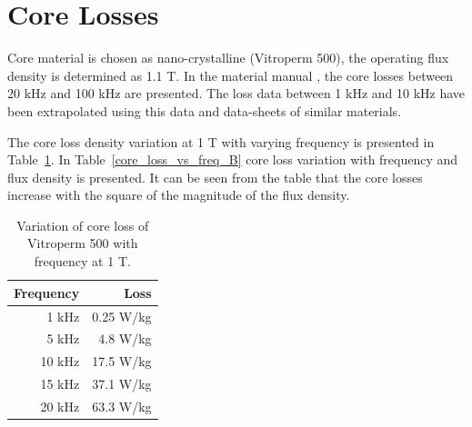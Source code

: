 \documentclass[a4paper, 11pt]{article} %
\begin{document}
\section{Core Losses}
Core material is chosen as nano-crystalline (Vitroperm 500), the operating flux density is determined as 1.1 T.  In the material manual \cite{Vacuumschmelze2003}, the core losses between 20 kHz and 100 kHz are presented. The loss data between 1 kHz  and 10 kHz have been extrapolated using this data and data-sheets of similar materials.  

The core loss density variation at 1 T with varying frequency is presented in Table~\ref{core_loss_vs_freq}. In Table~\ref{core_loss_vs_freq_B} core loss variation with frequency and flux density is presented. It can be seen from the table that the core losses increase with the square of the magnitude of the flux density. 
 
\begin{table}[]
\begin{center}
\begin{tabular}{rr}
Frequency & Loss \\
\hline
1 kHz &  0.25 W/kg\\
5 kHz &  4.8 W/kg\\
10 kHz & 17.5 W/kg\\
15 kHz & 37.1 W/kg\\
20 kHz &  63.3 W/kg\\
\hline
\end{tabular} 
\end{center}
\caption{Variation of core loss of Vitroperm 500 with frequency at 1 T.}
\label{core_loss_vs_freq}
\end{table}
\end{document}
